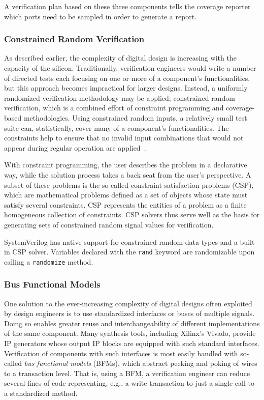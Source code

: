 \documentclass[conference]{IEEEtran}
\begin{document}
A verification plan based on these three components tells the coverage reporter which ports need to be sampled in order to generate a report.

\subsubsection{Constrained Random Verification}
As described earlier, the complexity of digital design is increasing with the capacity of the silicon. Traditionally, verification engineers would write a number of directed tests each focusing on one or more of a component's functionalities, but this approach becomes impractical for larger designs. Instead, a uniformly randomized verification methodology may be applied; constrained random verification, which is a combined effort of constraint programming and coverage-based methodologies.
Using constrained random inputs, a relatively small test suite can, statistically, cover many of a component's functionalities. 
The constraints help to ensure that no invalid input combinations that would not appear during regular operation are applied~\cite{MehtaCRV2018}.

With constraint programming, the user describes the problem in a declarative way, while the solution process takes a back seat from the user's perspective. A subset of these problems is the so-called constraint satisfaction problems (CSP), which are mathematical problems defined as a set of objects whose state must satisfy several constraints. CSP represents the entities of a problem as a finite homogeneous collection of constraints. CSP solvers thus serve well as the basis for generating sets of constrained random signal values for verification.

SystemVerilog has native support for constrained random data types and a built-in CSP solver. Variables declared with the \texttt{rand} keyword are randomizable upon calling a \texttt{randomize} method.

\subsubsection{Bus Functional Models}
One solution to the ever-increasing complexity of digital designs often exploited by design engineers is to use standardized interfaces or buses of multiple signals. Doing so enables greater reuse and interchangeability of different implementations of the same component. Many synthesis tools, including Xilinx's Vivado, provide IP generators whose output IP blocks are equipped with such standard interfaces. Verification of components with such interfaces is most easily handled with so-called \textit{bus functional models} (BFMs), which abstract peeking and poking of wires to a transaction level. That is, using a BFM, a verification engineer can reduce several lines of code representing, e.g., a write transaction to just a single call to a standardized method.
\end{document}
